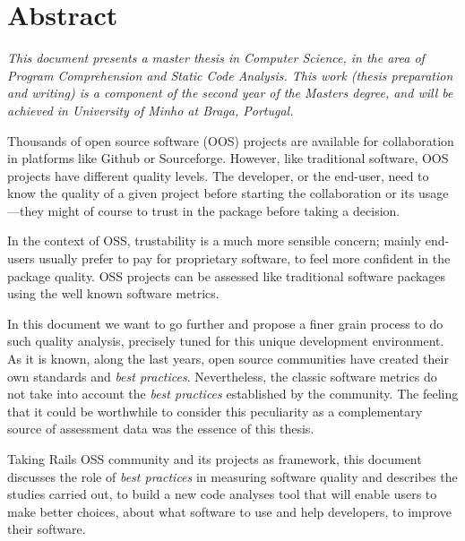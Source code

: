 \thispagestyle{plain}
\chapter*{Abstract}\label{chap:abstract}

{\it
  This document presents a master thesis in Computer Science, in the area of \textit{Program Comprehension and Static Code Analysis}.
  This work (thesis preparation and writing) is a component of the second year of the Masters degree,
  and will be achieved in University of Minho at Braga, Portugal. 

  Thousands of open source software (OOS) projects are available for collaboration in platforms like Github or Sourceforge.
  However, like traditional software, OOS projects have different quality levels.
  The developer, or the end-user, need to know the quality of a given project before starting the collaboration
  or its usage---they might of course to trust in the package before taking a decision.

  In the context of OSS, trustability is a much more sensible concern; mainly end-users usually prefer to pay for
  proprietary software, to feel more confident in the package quality.
  OSS projects can be assessed like traditional software packages using the well known software metrics.

  In this document we want to go further and propose a finer grain process to do such quality analysis,
  precisely tuned for this unique development environment.
  As it is known, along the last years, open source communities have created their own standards and \emph{best practices}.
  Nevertheless, the classic software metrics do not take into account the \emph{best practices}
  established by the community.
  The feeling that it could be worthwhile to consider this peculiarity as a complementary source of assessment data 
  was the essence of this thesis.
  
  Taking Rails OSS community and its projects as framework, this document discusses the role of
  \emph{best practices} in measuring software quality and describes the studies carried out, to build a new code analyses tool that 
  will enable users to make better choices, about what software to use and help developers, to improve their software.
}
